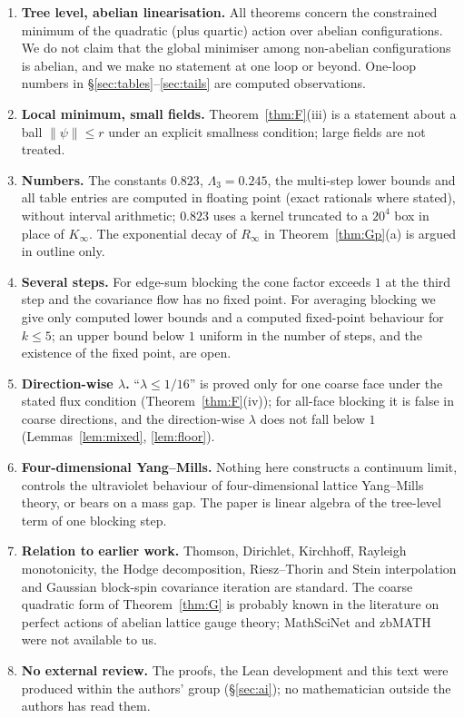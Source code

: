 \documentclass[11pt,a4paper]{article}
\theoremstyle{definition}
\theoremstyle{remark}
\begin{document}
\begin{enumerate}[label=\arabic*.]
\item \textbf{Tree level, abelian linearisation.} All theorems concern the constrained minimum of the quadratic (plus quartic) action over abelian configurations. We do not claim that the global minimiser among non-abelian configurations is abelian, and we make no statement at one loop or beyond. One-loop numbers in \S\ref{sec:tables}--\ref{sec:tails} are computed observations.
\item \textbf{Local minimum, small fields.} Theorem~\ref{thm:F}(iii) is a statement about a ball $\|\psi\|\le r$ under an explicit smallness condition; large fields are not treated.
\item \textbf{Numbers.} The constants $0.823$, $\Lambda_3=0.245$, the multi-step lower bounds and all table entries are computed in floating point (exact rationals where stated), without interval arithmetic; $0.823$ uses a kernel truncated to a $20^4$ box in place of $K_\infty$. The exponential decay of $R_\infty$ in Theorem~\ref{thm:Gp}(a) is argued in outline only.
\item \textbf{Several steps.} For edge-sum blocking the cone factor exceeds $1$ at the third step and the covariance flow has no fixed point. For averaging blocking we give only computed lower bounds and a computed fixed-point behaviour for $k\le5$; an upper bound below $1$ uniform in the number of steps, and the existence of the fixed point, are open.
\item \textbf{Direction-wise $\lambda$.} ``$\lambda\le1/16$'' is proved only for one coarse face under the stated flux condition (Theorem~\ref{thm:F}(iv)); for all-face blocking it is false in coarse directions, and the direction-wise $\lambda$ does not fall below $1$ (Lemmas~\ref{lem:mixed}, \ref{lem:floor}).
\item \textbf{Four-dimensional Yang--Mills.} Nothing here constructs a continuum limit, controls the ultraviolet behaviour of four-dimensional lattice Yang--Mills theory, or bears on a mass gap. The paper is linear algebra of the tree-level term of one blocking step.
\item \textbf{Relation to earlier work.} Thomson, Dirichlet, Kirchhoff, Rayleigh monotonicity, the Hodge decomposition, Riesz--Thorin and Stein interpolation and Gaussian block-spin covariance iteration are standard. The coarse quadratic form of Theorem~\ref{thm:G} is probably known in the literature on perfect actions of abelian lattice gauge theory; MathSciNet and zbMATH were not available to us.
\item \textbf{No external review.} The proofs, the Lean development and this text were produced within the authors' group (\S\ref{sec:ai}); no mathematician outside the authors has read them.
\end{enumerate}
\end{document}
